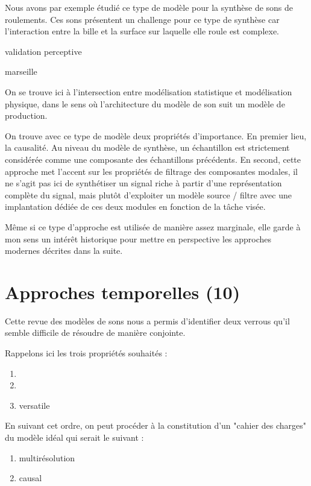 Nous avons par exemple étudié ce type de modèle pour la synthèse de sons de roulements. Ces sons présentent un challenge pour ce type de synthèse car l'interaction entre la bille et la surface sur laquelle elle roule est complexe.

 \cite{LagrangeTasslp10}

 validation perceptive

 \cite{Murphy11a}

marseille \cite{conan2014synthesis}

On se trouve ici à l'intersection entre modélisation statistique et modélisation physique, dans le sens où l'architecture du modèle de son suit un modèle de production.



On trouve avec ce type de modèle deux propriétés d'importance. En premier lieu, la causalité. Au niveau du modèle de synthèse, un échantillon est strictement considérée comme une composante des échantillons précédents.  En second, cette approche met l'accent sur les propriétés de filtrage des composantes modales, il ne s'agit pas ici de synthétiser un signal riche à partir d'une représentation complète du signal, mais plutôt d'exploiter un modèle source / filtre avec une implantation dédiée de ces deux modules en fonction de la tâche visée.

Même si ce type d'approche est utilisée de manière assez marginale, elle garde à mon sens un intérêt historique pour mettre en perspective les approches modernes décrites dans la suite.

\section{Approches temporelles (10)}

Cette revue des modèles de sons nous a permis d'identifier deux verrous qu'il semble difficile de résoudre de manière conjointe.

Rappelons ici les trois propriétés souhaités :
\begin{enumerate}
  \item
  \item
  \item versatile
\end{enumerate}

En suivant cet ordre, on peut procéder à la constitution d'un "cahier des charges" du modèle idéal qui serait le suivant :
\begin{enumerate}
  \item multirésolution
  \item causal

\end{enumerate}

